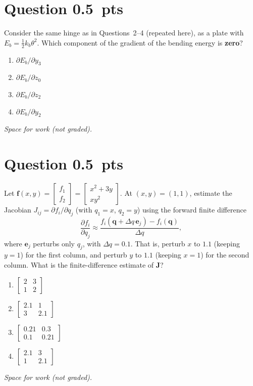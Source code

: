 \documentclass[letterpaper,11pt]{article}
\newcounter{qnum}
\newcommand{\qpts}{0.5}
\newcommand{\mcq}[5]{%
  \clearpage
  \stepcounter{qnum}%
  \section*{Question \theqnum \hfill \normalsize \qpts~pts}
  #1
  \begin{enumerate}[label=(\alph*)]
    \item #2
    \item #3
    \item #4
    \item #5
  \end{enumerate}
  \vspace{3mm}

  \textit{Space for work (not graded).}
}
\begin{document}
%
%
\mcq{Consider the same hinge as in Questions~2--4 (repeated here), as a plate with $E_b = \frac{1}{2} k_b \theta^2$. \hingesetup{}Which component of the gradient of the bending energy is \textbf{zero}?}
  {$\partial E_b / \partial y_3$}
  {$\partial E_b / \partial z_0$}
  {$\partial E_b / \partial z_2$}
  {$\partial E_b / \partial y_2$}

%
%
\mcq{Let $\mathbf{f}(x, y) = \begin{bmatrix} f_1 \\ f_2 \end{bmatrix} = \begin{bmatrix} x^2 + 3y \\ x y^2 \end{bmatrix}$. At $(x, y) = (1, 1)$, estimate the Jacobian $J_{ij} = \partial f_i / \partial q_j$ (with $q_1 = x$, $q_2 = y$) using the forward finite difference \[ \frac{\partial f_i}{\partial q_j} \approx \frac{f_i(\mathbf{q} + \Delta q\, \mathbf{e}_j) - f_i(\mathbf{q})}{\Delta q}, \] where $\mathbf{e}_j$ perturbs only $q_j$, with $\Delta q = 0.1$. That is, perturb $x$ to $1.1$ (keeping $y = 1$) for the first column, and perturb $y$ to $1.1$ (keeping $x = 1$) for the second column. What is the finite-difference estimate of $\mathbf{J}$?}
  {$\begin{bmatrix} 2 & 3 \\ 1 & 2 \end{bmatrix}$}
  {$\begin{bmatrix} 2.1 & 1 \\ 3 & 2.1 \end{bmatrix}$}
  {$\begin{bmatrix} 0.21 & 0.3 \\ 0.1 & 0.21 \end{bmatrix}$}
  {$\begin{bmatrix} 2.1 & 3 \\ 1 & 2.1 \end{bmatrix}$}
\end{document}
